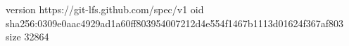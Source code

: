 version https://git-lfs.github.com/spec/v1
oid sha256:0309e0aac4929ad1a60ff803954007212d4e554f1467b1113d01624f367af803
size 32864
